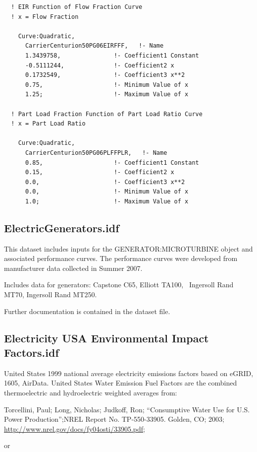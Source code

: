 \begin{lstlisting}
  ! EIR Function of Flow Fraction Curve
  ! x = Flow Fraction

    Curve:Quadratic,
      CarrierCenturion50PG06EIRFFF,   !- Name
      1.3439758,               !- Coefficient1 Constant
      -0.5111244,              !- Coefficient2 x
      0.1732549,               !- Coefficient3 x**2
      0.75,                    !- Minimum Value of x
      1.25;                    !- Maximum Value of x

  ! Part Load Fraction Function of Part Load Ratio Curve
  ! x = Part Load Ratio

    Curve:Quadratic,
      CarrierCenturion50PG06PLFFPLR,   !- Name
      0.85,                    !- Coefficient1 Constant
      0.15,                    !- Coefficient2 x
      0.0,                     !- Coefficient3 x**2
      0.0,                     !- Minimum Value of x
      1.0;                     !- Maximum Value of x
\end{lstlisting}

\subsection{ElectricGenerators.idf}\label{electricgenerators.idf}

This dataset includes inputs for the GENERATOR:MICROTURBINE object and associated performance curves. The performance curves were developed from manufacturer data collected in Summer 2007.

Includes data for generators: Capstone C65, Elliott TA100,~ Ingersoll Rand MT70, Ingersoll Rand MT250.

Further documentation is contained in the dataset file.

\subsection{Electricity USA Environmental Impact Factors.idf}\label{electricity-usa-environmental-impact-factors.idf}

United States 1999 national average electricity emissions factors based on eGRID, 1605, AirData. United States Water Emission Fuel Factors are the combined thermoelectric and hydroelectric weighted averages from:

Torcellini, Paul; Long, Nicholas; Judkoff, Ron; ``Consumptive Water Use for U.S. Power Production'';NREL Report No. TP-550-33905. Golden, CO; 2003; \url{http://www.nrel.gov/docs/fy04osti/33905.pdf};

or

